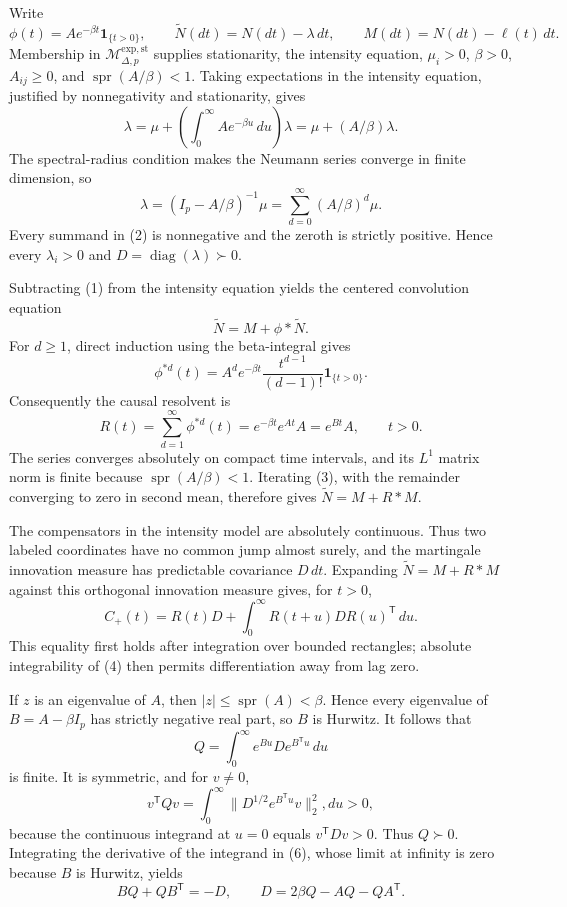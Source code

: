 Write
\[
 \phi(t)=Ae^{-\beta t}\mathbf 1_{\{t>0\}},\qquad
 \widetilde N(dt)=N(dt)-\lambda\,dt,
 \qquad M(dt)=N(dt)-\ell(t)\,dt .
\]
Membership in \(\mathcal M_{\Delta,p}^{\mathrm{exp,st}}\) supplies stationarity, the intensity equation, \(\mu_i>0\), \(\beta>0\), \(A_{ij}\geq0\), and \(\operatorname{spr}(A/\beta)<1\).  Taking expectations in the intensity equation, justified by nonnegativity and stationarity, gives
\[
 \lambda=\mu+\left(\int_0^\infty Ae^{-\beta u}\,du\right)\lambda
 =\mu+(A/\beta)\lambda .                                      \tag{1}
\]
The spectral-radius condition makes the Neumann series converge in finite dimension, so
\[
 \lambda=(I_p-A/\beta)^{-1}\mu
 =\sum_{d=0}^{\infty}(A/\beta)^d\mu .                            \tag{2}
\]
Every summand in (2) is nonnegative and the zeroth is strictly positive.  Hence every \(\lambda_i>0\) and \(D=\operatorname{diag}(\lambda)\succ0\).

Subtracting (1) from the intensity equation yields the centered convolution equation
\[
 \widetilde N=M+\phi*\widetilde N .                              \tag{3}
\]
For \(d\geq1\), direct induction using the beta-integral gives
\[
 \phi^{*d}(t)=A^d e^{-\beta t}\frac{t^{d-1}}{(d-1)!}\mathbf 1_{\{t>0\}}.
\]
Consequently the causal resolvent is
\[
 R(t)=\sum_{d=1}^{\infty}\phi^{*d}(t)
 =e^{-\beta t}e^{At}A=e^{Bt}A,\qquad t>0.                       \tag{4}
\]
The series converges absolutely on compact time intervals, and its \(L^1\) matrix norm is finite because \(\operatorname{spr}(A/\beta)<1\).  Iterating (3), with the remainder converging to zero in second mean, therefore gives \(\widetilde N=M+R*M\).

The compensators in the intensity model are absolutely continuous.  Thus two labeled coordinates have no common jump almost surely, and the martingale innovation measure has predictable covariance \(D\,dt\).  Expanding \(\widetilde N=M+R*M\) against this orthogonal innovation measure gives, for \(t>0\),
\[
 C_+(t)=R(t)D+\int_0^\infty R(t+u)D R(u)^{\mathsf T}\,du .      \tag{5}
\]
This equality first holds after integration over bounded rectangles; absolute integrability of (4) then permits differentiation away from lag zero.

If \(z\) is an eigenvalue of \(A\), then \(|z|\leq\operatorname{spr}(A)<\beta\).  Hence every eigenvalue of \(B=A-\beta I_p\) has strictly negative real part, so \(B\) is Hurwitz.  It follows that
\[
 Q=\int_0^\infty e^{Bu}D e^{B^{\mathsf T}u}\,du                \tag{6}
\]
is finite.  It is symmetric, and for \(v\neq0\),
\[
 v^{\mathsf T}Qv
 =\int_0^\infty\lVert D^{1/2}e^{B^{\mathsf T}u}v\rVert_2^2,du>0, \tag{7}
\]
because the continuous integrand at \(u=0\) equals \(v^{\mathsf T}Dv>0\).  Thus \(Q\succ0\).  Integrating the derivative of the integrand in (6), whose limit at infinity is zero because \(B\) is Hurwitz, yields
\[
 BQ+QB^{\mathsf T}=-D,\qquad
 D=2\beta Q-AQ-QA^{\mathsf T}.                                  \tag{8}
\]

